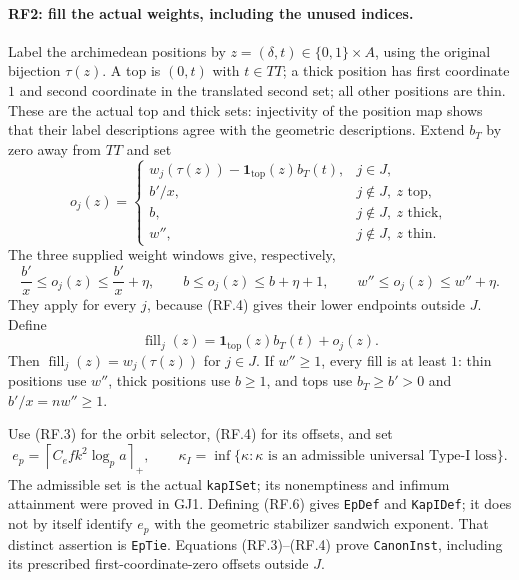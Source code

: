 \paragraph{RF2: fill the actual weights, including the unused indices.}
Label the archimedean positions by $z=(\delta,t)\in\{0,1\}\times A$,
using the original bijection $\tau(z)$. A top is $(0,t)$ with
$t\in TT$; a thick position has first coordinate $1$ and second
coordinate in the translated second set; all other positions are thin.
These are the actual top and thick sets: injectivity of the position map
shows that their label descriptions agree with the geometric descriptions.
Extend $b_T$ by zero away from $TT$ and set
\[
 o_j(z)=
 \begin{cases}
 w_j(\tau(z))-\mathbf1_{\mathrm{top}}(z)b_T(t),&j\in J,\\
 b'/x,&j\notin J,\ z\text{ top},\\
 b,&j\notin J,\ z\text{ thick},\\
 w'',&j\notin J,\ z\text{ thin}.
 \end{cases}                                                  \tag{RF.4}
\]
The three supplied weight windows give, respectively,
\[
 \frac{b'}x\leq o_j(z)\leq\frac{b'}x+\eta,\qquad
 b\leq o_j(z)\leq b+\eta+1,\qquad
 w''\leq o_j(z)\leq w''+\eta.                                 \tag{RF.5}
\]
They apply for every $j$, because (RF.4) gives their lower endpoints
outside $J$. Define
\[
 \operatorname{fill}_j(z)=\mathbf1_{\mathrm{top}}(z)b_T(t)+o_j(z).
\]
Then $\operatorname{fill}_j(z)=w_j(\tau(z))$ for $j\in J$.
If $w''\geq1$, every fill is at least $1$: thin positions use $w''$,
thick positions use $b\geq1$, and tops use $b_T\geq b'>0$ and
$b'/x=nw''\geq1$.

Use (RF.3) for the orbit selector, (RF.4) for its offsets, and set
\[
 e_p=\left\lceil C_e f k^2\log_p a\right\rceil_+,
 \qquad \kappa_I=\inf\{\kappa:\kappa\text{ is an admissible
                            universal Type-I loss}\}.         \tag{RF.6}
\]
The admissible set is the actual \texttt{kapISet}; its nonemptiness and
infimum attainment were proved in GJ1. Defining (RF.6) gives
\texttt{EpDef} and \texttt{KapIDef}; it does not by itself identify $e_p$
with the geometric stabilizer sandwich exponent. That distinct assertion
is \texttt{EpTie}. Equations (RF.3)--(RF.4) prove \texttt{CanonInst},
including its prescribed first-coordinate-zero offsets outside $J$.

